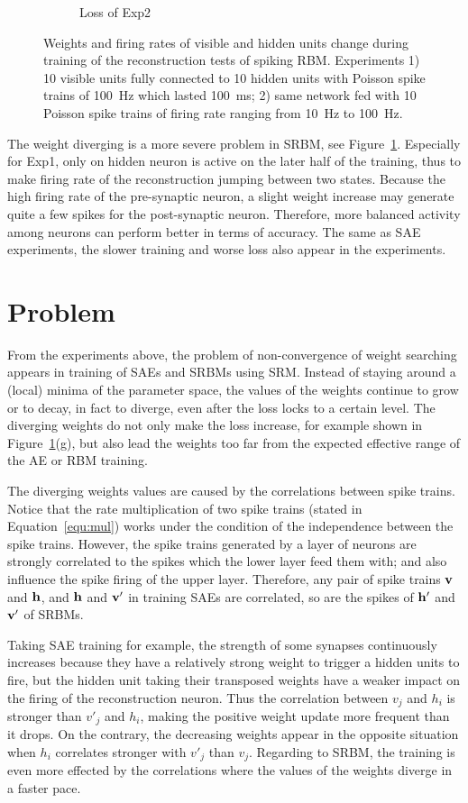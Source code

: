 \begin{figure}
\begin{subfigure}[t]{0.45\textwidth}
		\caption{Loss of Exp2}
	\end{subfigure}
	\caption{Weights and firing rates of visible and hidden units change during training of the reconstruction tests of spiking RBM. 
		Experiments 1) 10 visible units fully connected to 10 hidden units with Poisson spike trains of 100~Hz which lasted 100~ms; 2) same network fed with 10 Poisson spike trains of firing rate ranging from 10~Hz to 100~Hz.}
\label{fig:srbm_orig}
\end{figure}

The weight diverging is a more severe problem in SRBM, see Figure~\ref{fig:srbm_orig}.
Especially for Exp1, only on hidden neuron is active on the later half of the training, thus to make firing rate of the reconstruction jumping between two states.
Because the high firing rate of the pre-synaptic neuron, a slight weight increase may generate quite a few spikes for the post-synaptic neuron.
Therefore, more balanced activity among neurons can perform better in terms of accuracy.
The same as SAE experiments, the slower training and worse loss also appear in the experiments.

\section{Problem}
\label{sec:problem}
From the experiments above, the problem of non-convergence of weight searching appears in training of SAEs and SRBMs using SRM.
Instead of staying around a (local) minima of the parameter space, the values of the weights continue to grow or to decay, in fact to diverge, even after the loss locks to a certain level.
The diverging weights do not only make the loss increase, for example shown in Figure~\ref{fig:srbm_orig}(g), but also lead the weights too far from the expected effective range of the AE or RBM training.

The diverging weights values are caused by the correlations between spike trains.
Notice that the rate multiplication of two spike trains (stated in Equation~\ref{equ:mul}) works under the condition of the independence between the spike trains.
However, the spike trains generated by a layer of neurons are strongly correlated to the spikes which the lower layer feed them with; and also influence the spike firing of the upper layer.
Therefore, any pair of spike trains $\bf{v}$ and $\bf{h}$, and $\bf{h}$ and $\bf{v'}$ in training SAEs are correlated, so are the spikes of $\bf{h'}$ and $\bf{v'}$ of SRBMs.


Taking SAE training for example, the strength of some synapses continuously increases because they have a relatively strong weight to trigger a hidden units to fire, but the hidden unit taking their transposed weights have a weaker impact on the firing of the reconstruction neuron.
Thus the correlation between $v_j$ and $h_i$ is stronger than $v'_j$ and $h_i$, making the positive weight update more frequent than it drops.
On the contrary, the decreasing weights appear in the opposite situation when $h_i$ correlates stronger with $v'_j$ than $v_j$.
Regarding to SRBM, the training is even more effected by the correlations where the values of the weights diverge in a faster pace.
 
